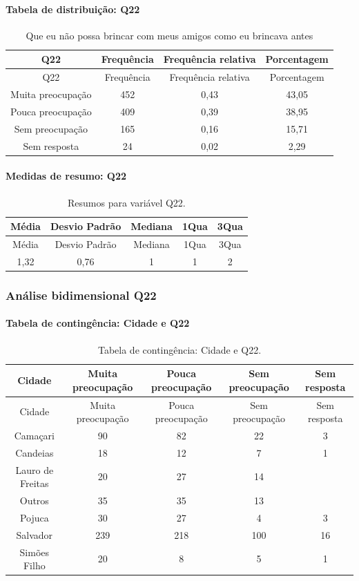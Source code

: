 \documentclass[]{article}
\let\oldparagraph\paragraph
\renewcommand{\paragraph}[1]{\oldparagraph{#1}\mbox{}}
\begin{document}
\hypertarget{tabela-de-distribuiuxe7uxe3o-q22}{%
\paragraph{Tabela de distribuição: Q22}\label{tabela-de-distribuiuxe7uxe3o-q22}}

\begin{longtable}[]{@{}cccc@{}}
\caption{\label{tab:unnamed-chunk-362}Que eu não possa brincar com meus amigos como eu brincava antes}\tabularnewline
\toprule
Q22 & Frequência & Frequência relativa & Porcentagem\tabularnewline
\midrule
\endfirsthead
\toprule
Q22 & Frequência & Frequência relativa & Porcentagem\tabularnewline
\midrule
\endhead
Muita preocupação & 452 & 0,43 & 43,05\tabularnewline
Pouca preocupação & 409 & 0,39 & 38,95\tabularnewline
Sem preocupação & 165 & 0,16 & 15,71\tabularnewline
Sem resposta & 24 & 0,02 & 2,29\tabularnewline
\bottomrule
\end{longtable}

\hypertarget{medidas-de-resumo-q22}{%
\paragraph{Medidas de resumo: Q22}\label{medidas-de-resumo-q22}}

\begin{longtable}[]{@{}ccccc@{}}
\caption{\label{tab:unnamed-chunk-363}Resumos para variável Q22.}\tabularnewline
\toprule
Média & Desvio Padrão & Mediana & 1Qua & 3Qua\tabularnewline
\midrule
\endfirsthead
\toprule
Média & Desvio Padrão & Mediana & 1Qua & 3Qua\tabularnewline
\midrule
\endhead
1,32 & 0,76 & 1 & 1 & 2\tabularnewline
\bottomrule
\end{longtable}

\cleardoublepage

\hypertarget{anuxe1lise-bidimensional-q22}{%
\subsubsection{Análise bidimensional Q22}\label{anuxe1lise-bidimensional-q22}}

\hypertarget{tabela-de-continguxeancia-cidade-e-q22}{%
\paragraph{Tabela de contingência: Cidade e Q22}\label{tabela-de-continguxeancia-cidade-e-q22}}

\begin{longtable}[]{@{}ccccc@{}}
\caption{\label{tab:unnamed-chunk-364}Tabela de contingência: Cidade e Q22.}\tabularnewline
\toprule
Cidade & Muita preocupação & Pouca preocupação & Sem preocupação & Sem resposta\tabularnewline
\midrule
\endfirsthead
\toprule
Cidade & Muita preocupação & Pouca preocupação & Sem preocupação & Sem resposta\tabularnewline
\midrule
\endhead
Camaçari & 90 & 82 & 22 & 3\tabularnewline
Candeias & 18 & 12 & 7 & 1\tabularnewline
Lauro de Freitas & 20 & 27 & 14 &\tabularnewline
Outros & 35 & 35 & 13 &\tabularnewline
Pojuca & 30 & 27 & 4 & 3\tabularnewline
Salvador & 239 & 218 & 100 & 16\tabularnewline
Simões Filho & 20 & 8 & 5 & 1\tabularnewline
\bottomrule
\end{longtable}
\end{document}

